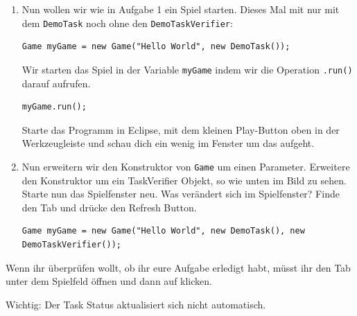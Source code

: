 

\begin{enumerate}
    \item Nun wollen wir wie in Aufgabe 1 ein Spiel starten. 
        Dieses Mal mit nur mit dem \lstinline{DemoTask} noch ohne den \lstinline{DemoTaskVerifier}:

    \begin{lstlisting}
Game myGame = new Game("Hello World", new DemoTask());
    \end{lstlisting}

    Wir starten das Spiel in der Variable \lstinline{myGame} indem wir die Operation \lstinline{.run()} darauf aufrufen.

    \begin{lstlisting}
myGame.run();
    \end{lstlisting}

    Starte das Programm in Eclipse, mit dem kleinen Play-Button oben in der Werkzeugleiste und schau dich ein wenig im Fenster um das aufgeht.

    \item Nun erweitern wir den Konstruktor von \texttt{Game} um einen Parameter. 
        Erweitere den Konstruktor um ein TaskVerifier Objekt, so wie unten im Bild zu sehen. 
        Starte nun das Spielfenster neu. 
        Was verändert sich im Spielfenster? 
        Finde den  Tab und drücke den Refresh Button.

    \begin{lstlisting}
Game myGame = new Game("Hello World", new DemoTask(), new DemoTaskVerifier());
    \end{lstlisting}

\end{enumerate}


\begin{Infobox}
    Wenn ihr überprüfen wollt, ob ihr eure Aufgabe erledigt habt, müsst ihr den  Tab unter dem Spielfeld öffnen und dann auf  klicken.

    Wichtig: Der Task Status aktualisiert sich nicht automatisch.
\end{Infobox}


